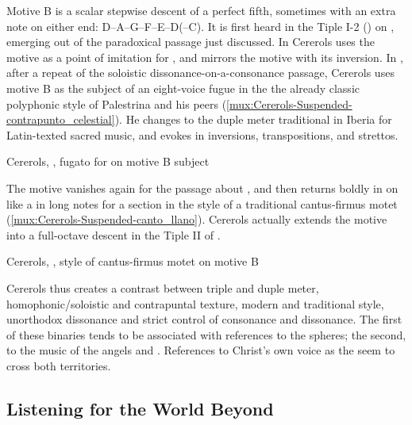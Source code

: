 Motive B is a scalar stepwise descent of a perfect fifth, sometimes with an
extra note on either end: D--A--G--F--E--D(--C\sh). 
It is first heard in the Tiple I-2 () on ,
emerging out of the paradoxical passage just discussed.
In  Cererols uses the motive as a point of imitation for
, and mirrors the motive with its
inversion.
In , after a repeat of the soloistic dissonance-on-a-consonance
passage, Cererols uses motive B as the subject of an eight-voice fugue in the
the already classic polyphonic style of Palestrina and his peers
(\cref{mux:Cererols-Suspended-contrapunto_celestial}).
He changes to the duple meter traditional in Iberia for Latin-texted sacred
music, and evokes  in inversions, transpositions,
and strettos.  

{Cererols, , fugato  for  on motive B subject}

The motive vanishes again for the passage about , and then
returns boldly in  on  like a
  in long notes for a section in the
style of a traditional cantus-firmus motet
(\cref{mux:Cererols-Suspended-canto_llano}).
Cererols actually extends the motive into a full-octave descent in the Tiple II
of .

{Cererols, , style of cantus-firmus motet on motive B}

Cererols thus creates a contrast between triple and duple meter,
homophonic/soloistic and contrapuntal texture, modern and traditional style,
unorthodox dissonance and strict control of consonance and dissonance.
The first of these binaries tends to be associated with references to the
spheres; the second, to the music of the angels and . 
References to Christ's own voice as the  seem to cross both
territories.

\subsection{Listening for the World Beyond}

